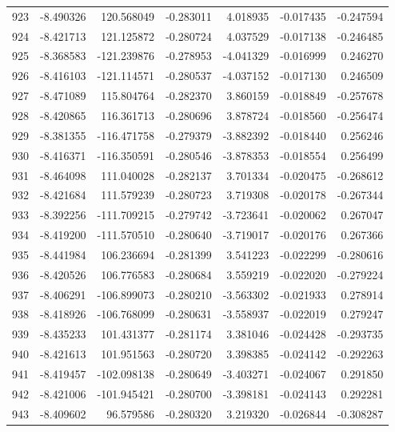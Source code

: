 \begin{tabular}{rrrrrrr}
 923 &  -8.490326 &  120.568049 & -0.283011 &    4.018935 &   -0.017435 & -0.247594 \\
 924 &  -8.421713 &  121.125872 & -0.280724 &    4.037529 &   -0.017138 & -0.246485 \\
 925 &  -8.368583 & -121.239876 & -0.278953 &   -4.041329 &   -0.016999 &  0.246270 \\
 926 &  -8.416103 & -121.114571 & -0.280537 &   -4.037152 &   -0.017130 &  0.246509 \\
 927 &  -8.471089 &  115.804764 & -0.282370 &    3.860159 &   -0.018849 & -0.257678 \\
 928 &  -8.420865 &  116.361713 & -0.280696 &    3.878724 &   -0.018560 & -0.256474 \\
 929 &  -8.381355 & -116.471758 & -0.279379 &   -3.882392 &   -0.018440 &  0.256246 \\
 930 &  -8.416371 & -116.350591 & -0.280546 &   -3.878353 &   -0.018554 &  0.256499 \\
 931 &  -8.464098 &  111.040028 & -0.282137 &    3.701334 &   -0.020475 & -0.268612 \\
 932 &  -8.421684 &  111.579239 & -0.280723 &    3.719308 &   -0.020178 & -0.267344 \\
 933 &  -8.392256 & -111.709215 & -0.279742 &   -3.723641 &   -0.020062 &  0.267047 \\
 934 &  -8.419200 & -111.570510 & -0.280640 &   -3.719017 &   -0.020176 &  0.267366 \\
 935 &  -8.441984 &  106.236694 & -0.281399 &    3.541223 &   -0.022299 & -0.280616 \\
 936 &  -8.420526 &  106.776583 & -0.280684 &    3.559219 &   -0.022020 & -0.279224 \\
 937 &  -8.406291 & -106.899073 & -0.280210 &   -3.563302 &   -0.021933 &  0.278914 \\
 938 &  -8.418926 & -106.768099 & -0.280631 &   -3.558937 &   -0.022019 &  0.279247 \\
 939 &  -8.435233 &  101.431377 & -0.281174 &    3.381046 &   -0.024428 & -0.293735 \\
 940 &  -8.421613 &  101.951563 & -0.280720 &    3.398385 &   -0.024142 & -0.292263 \\
 941 &  -8.419457 & -102.098138 & -0.280649 &   -3.403271 &   -0.024067 &  0.291850 \\
 942 &  -8.421006 & -101.945421 & -0.280700 &   -3.398181 &   -0.024143 &  0.292281 \\
 943 &  -8.409602 &   96.579586 & -0.280320 &    3.219320 &   -0.026844 & -0.308287 \\

\end{tabular}

